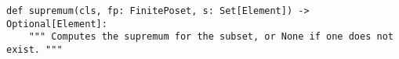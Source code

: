 \begin{verbatim}
def supremum(cls, fp: FinitePoset, s: Set[Element]) -> Optional[Element]:
    """ Computes the supremum for the subset, or None if one does not exist. """
\end{verbatim}